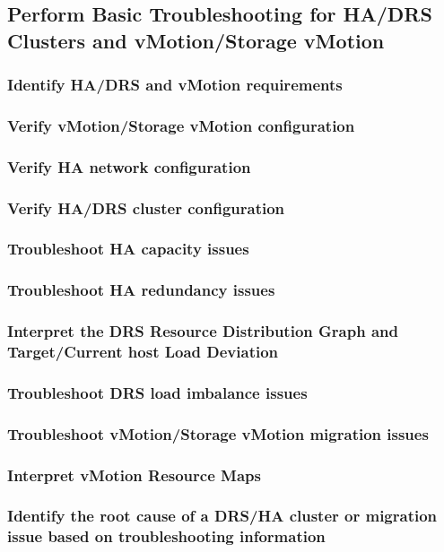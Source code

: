 \subsection{Perform Basic Troubleshooting for HA/DRS Clusters and vMotion/Storage vMotion}

\subsubsection{Identify HA/DRS and vMotion requirements}

\subsubsection{Verify vMotion/Storage vMotion configuration}

\subsubsection{Verify HA network configuration}

\subsubsection{Verify HA/DRS cluster configuration}

\subsubsection{Troubleshoot HA capacity issues}

\subsubsection{Troubleshoot HA redundancy issues}

\subsubsection{Interpret the DRS Resource Distribution Graph and Target/Current host Load Deviation}

\subsubsection{Troubleshoot DRS load imbalance issues}

\subsubsection{Troubleshoot vMotion/Storage vMotion migration issues}

\subsubsection{Interpret vMotion Resource Maps}

\subsubsection{Identify the root cause of a DRS/HA cluster or migration issue based on troubleshooting information}

